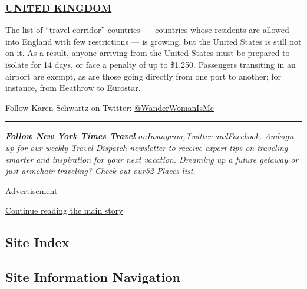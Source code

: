 \hypertarget{united-kingdom}{%
\subsubsection{\texorpdfstring{\href{https://www.gov.uk/uk-border-control}{UNITED
KINGDOM}}{UNITED KINGDOM}}\label{united-kingdom}}

The list of ``travel corridor'' countries ---~countries whose residents
are allowed into England with few restrictions --- is growing, but the
United States is still not on it. As a result, anyone arriving from the
United States must be prepared to isolate for 14 days, or face a penalty
of up to \$1,250. Passengers transiting in an airport are exempt, as are
those going directly from one port to another; for instance, from
Heathrow to Eurostar.

Follow Karen Schwartz on Twitter:
\href{https://twitter.com/wanderwomanisme?lang=en}{@WanderWomanIsMe}

\begin{center}\rule{0.5\linewidth}{\linethickness}\end{center}

\emph{\textbf{Follow New York Times Travel}}
\emph{on}\href{https://www.instagram.com/nytimestravel/}{\emph{Instagram}}\emph{,}\href{https://twitter.com/nytimestravel}{\emph{Twitter}}
\emph{and}\href{https://www.facebook.com/nytimestravel/}{\emph{Facebook}}\emph{.
And}\href{https://www.nytimes.com/newsletters/traveldispatch}{\emph{sign
up for our weekly Travel Dispatch newsletter}} \emph{to receive expert
tips on traveling smarter and inspiration for your next vacation.
Dreaming up a future getaway or just armchair traveling? Check out
our}\href{https://www.nytimes.com/interactive/2020/travel/places-to-visit.html}{\emph{52
Places list}}\emph{.}

Advertisement

\protect\hyperlink{after-bottom}{Continue reading the main story}

\hypertarget{site-index}{%
\subsection{Site Index}\label{site-index}}

\hypertarget{site-information-navigation}{%
\subsection{Site Information
Navigation}\label{site-information-navigation}}

